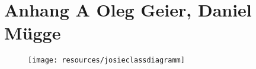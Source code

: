 \chapter[Anhang A]{Anhang A \small{Oleg Geier, Daniel Mügge}}\label{ch:AnhangA}

\begin{figure}[H]
  \centering
  \texttt{[image: resources/josieclassdiagramm]}
\end{figure}
